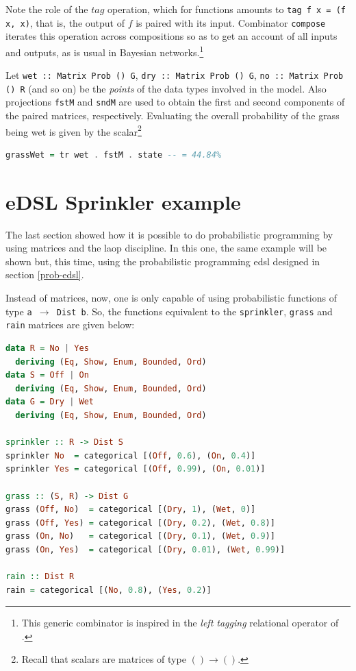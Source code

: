 \documentclass[
  oneside,
  11pt, a4paper,
  footinclude=true,
  headinclude=true,
  cleardoublepage=empty
]{scrbook}
\theoremstyle{definition}
\theoremstyle{definition}
\begin{document}
        Note the role of the $tag$ operation, which for functions amounts to \texttt{tag f x = (f x, x)}, that is, the output of $f$ is paired with its input. Combinator \texttt{compose} iterates this operation across compositions so as to get an account of all inputs and outputs, as is usual in Bayesian networks.\footnote{This generic combinator is inspired in the \emph{left tagging} relational operator of \cite{Bu01}.} 
        
        Let \texttt{wet :: Matrix Prob () G}, \texttt{dry :: Matrix Prob () G}, \texttt{no :: Matrix Prob () R} (and so on) be the \emph{points} of the data types involved in the model. Also projections \texttt{fstM} and \texttt{sndM} are used to obtain the first and second components of the paired matrices, respectively.
        Evaluating the overall probability of the grass being wet is given by
        the scalar\footnote{Recall that scalars are matrices of type \ensuremath{\mathrm{()}\to
        \mathrm{()}}.} 
        \begin{lstlisting}[language=Haskell, caption={Probability of grass being wet calculation}, captionpos=b]
grassWet = tr wet . fstM . state -- = 44.84%
        \end{lstlisting}{}
        
        \section{eDSL Sprinkler example}
        
        The last section showed how it is possible to do probabilistic programming by using matrices and the \gls{laop} discipline. In this one, the same example will be shown but, this time, using the probabilistic programming \gls{edsl} designed in section \ref{prob-edsl}.
        
        Instead of matrices, now, one is only capable of using probabilistic functions of type \texttt{a $\to$ Dist b}. So, the functions equivalent to the \texttt{sprinkler}, \texttt{grass} and \texttt{rain} matrices are given below:
        
        \begin{lstlisting}[language=Haskell, caption={Example probabilistic functions}, captionpos=b]
data R = No | Yes
  deriving (Eq, Show, Enum, Bounded, Ord)
data S = Off | On
  deriving (Eq, Show, Enum, Bounded, Ord)
data G = Dry | Wet
  deriving (Eq, Show, Enum, Bounded, Ord)

sprinkler :: R -> Dist S
sprinkler No  = categorical [(Off, 0.6), (On, 0.4)]
sprinkler Yes = categorical [(Off, 0.99), (On, 0.01)]

grass :: (S, R) -> Dist G
grass (Off, No)  = categorical [(Dry, 1), (Wet, 0)]
grass (Off, Yes) = categorical [(Dry, 0.2), (Wet, 0.8)]
grass (On, No)   = categorical [(Dry, 0.1), (Wet, 0.9)]
grass (On, Yes)  = categorical [(Dry, 0.01), (Wet, 0.99)]

rain :: Dist R
rain = categorical [(No, 0.8), (Yes, 0.2)]
        \end{lstlisting}{}
        
\end{document}
